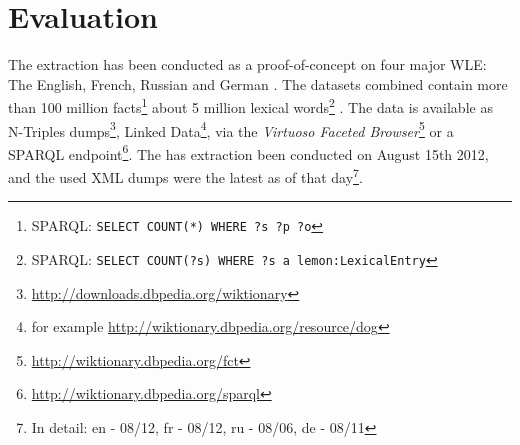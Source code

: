 \section{Evaluation}
\label{sec:evaluation}
The extraction has been conducted as a proof-of-concept on four major WLE:
The English, French, Russian and German \wik.
The datasets combined contain more than 100 million facts\footnote{SPARQL: \texttt{SELECT COUNT(*) WHERE {?s ?p ?o}}} about 5 million lexical words\footnote{SPARQL: \texttt{SELECT COUNT(?s) WHERE {?s a lemon:LexicalEntry}}} .
The data is available as N-Triples dumps\footnote{\url{http://downloads.dbpedia.org/wiktionary}}, Linked Data\footnote{for example \url{http://wiktionary.dbpedia.org/resource/dog}}, via the \emph{Virtuoso Faceted Browser}\footnote{\url{http://wiktionary.dbpedia.org/fct}} or a SPARQL endpoint\footnote{\url{http://wiktionary.dbpedia.org/sparql}}.
The has extraction been conducted on August 15th 2012, and the used XML dumps were the latest as of that day\footnote{In detail: en - 08/12, fr - 08/12, ru - 08/06, de - 08/11}.

